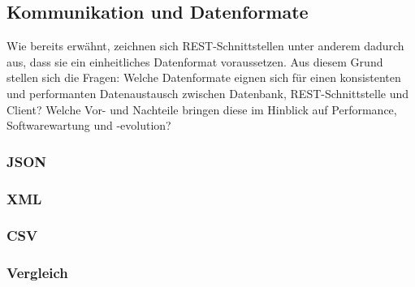 	\subsection{Kommunikation und Datenformate}
	Wie bereits erwähnt, zeichnen sich REST-Schnittstellen unter anderem dadurch aus, dass sie ein einheitliches Datenformat voraussetzen. Aus diesem Grund stellen sich die Fragen: Welche Datenformate eignen sich für einen konsistenten und performanten Datenaustausch zwischen Datenbank, REST-Schnittstelle und Client? Welche Vor- und Nachteile bringen diese im Hinblick auf Performance, Softwarewartung und -evolution?
		\subsubsection{JSON}
		\subsubsection{XML}
		\subsubsection{CSV}
		\subsubsection{Vergleich}